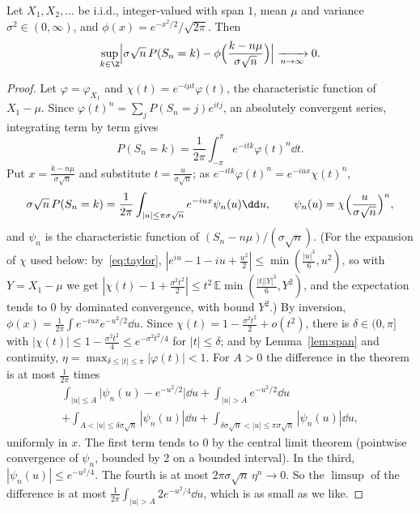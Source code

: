 \begin{theorem}\label{thm:llt}
Let $X_1,X_2,\dots$ be i.i.d., integer-valued with span $1$, mean $\mu$ and variance $\sigma^2\in(0,\infty)$, and $\phi(x)=e^{-x^2/2}/\sqrt{2\pi}$. Then
\[
\sup_{k\in\Z}\Bigl|\sigma\sqrt n\,P(S_n=k)-\phi\Bigl(\frac{k-n\mu}{\sigma\sqrt n}\Bigr)\Bigr|\xrightarrow[n\to\infty]{}0.
\]
\end{theorem}
\begin{proof}
Let $\varphi=\varphi_{X_1}$ and $\chi(t)=e^{-i\mu t}\varphi(t)$, the characteristic function of $X_1-\mu$. Since $\varphi(t)^n=\sum_jP(S_n=j)e^{itj}$, an absolutely
convergent series, integrating term by term gives
\[
P(S_n=k)=\frac1{2\pi}\int_{-\pi}^\pi e^{-itk}\varphi(t)^n\dd t.
\]
Put $x=\frac{k-n\mu}{\sigma\sqrt n}$ and substitute $t=\frac u{\sigma\sqrt n}$; as $e^{-itk}\varphi(t)^n=e^{-iux}\chi(t)^n$,
\[
\sigma\sqrt n\,P(S_n=k)=\frac1{2\pi}\int_{|u|\le\pi\sigma\sqrt n}e^{-iux}\psi_n(u)\dd u,\qquad\psi_n(u)=\chi\Bigl(\frac u{\sigma\sqrt n}\Bigr)^n,
\]
and $\psi_n$ is the characteristic function of $(S_n-n\mu)/(\sigma\sqrt n)$. (For the expansion of $\chi$ used below: by~\eqref{eq:taylor},
$|e^{iu}-1-iu+\frac{u^2}2|\le\min(\frac{|u|^3}6,u^2)$, so with $Y=X_1-\mu$ we get $|\chi(t)-1+\frac{\sigma^2t^2}2|\le t^2\,\mathbb E\min(\frac{|t||Y|^3}6,Y^2)$, and
the expectation tends to $0$ by dominated convergence, with bound $Y^2$.) By inversion, $\phi(x)=\frac1{2\pi}\int e^{-iux}e^{-u^2/2}\dd u$. Since
$\chi(t)=1-\frac{\sigma^2t^2}2+o(t^2)$, there is $\delta\in(0,\pi]$ with $|\chi(t)|\le1-\frac{\sigma^2t^2}4\le e^{-\sigma^2t^2/4}$ for
$|t|\le\delta$; and by Lemma~\ref{lem:span} and continuity, $\eta=\max_{\delta\le|t|\le\pi}|\varphi(t)|<1$. For $A>0$ the difference in the theorem is
at most $\frac1{2\pi}$ times
\[
\begin{gathered}
\int_{|u|\le A}\bigl|\psi_n(u)-e^{-u^2/2}\bigr|\dd u+\int_{|u|>A}e^{-u^2/2}\dd u\\
+\int_{A<|u|\le\delta\sigma\sqrt n}|\psi_n(u)|\dd u+\int_{\delta\sigma\sqrt n<|u|\le\pi\sigma\sqrt n}|\psi_n(u)|\dd u,
\end{gathered}
\]
uniformly in $x$. The first term tends to $0$ by the central limit theorem (pointwise convergence of $\psi_n$, bounded by $2$ on a bounded interval).
In the third, $|\psi_n(u)|\le e^{-u^2/4}$. The fourth is at most $2\pi\sigma\sqrt n\,\eta^n\to0$. So the $\limsup$ of the difference is at most
$\frac1{2\pi}\int_{|u|>A}2e^{-u^2/4}\dd u$, which is as small as we like.
\end{proof}

